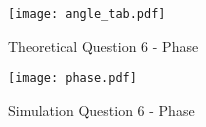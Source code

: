 \begin{figure}[H]
      \texttt{[image: angle\_tab.pdf]}
      \caption{Theoretical Question 6 - Phase}
    \endminipage\hfill
      \texttt{[image: phase.pdf]}
      \caption{Simulation Question 6 - Phase}
    \endminipage\hfill
\end{figure}
